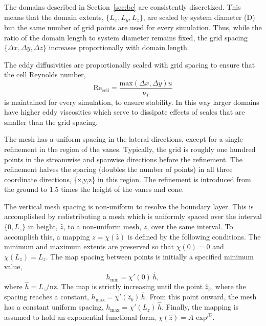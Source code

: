 %
%
The domains described in Section~\ref{sec:bc} are consistently
discretized. This means that the domain extents, $\{L_x,L_y,L_z\}$, are
scaled by system diameter (D) but the same number of grid points are
used for every simulation. Thus, while the ratio of the domain length to
system diameter remains fixed, the grid spacing $\{\Delta x,\Delta
y,\Delta z\}$ increases proportionally with domain length.  

The eddy diffusivities are proportionally scaled with grid spacing to
ensure that the cell Reynolds number, 
\begin{equation}
 \text{Re}_\text{cell} = \frac{\text{max}(\Delta x,\Delta y) u}{\nu_T}
\end{equation} 
is maintained for every simulation, to ensure stability. In this way
 larger domains have higher eddy viscosities which serve to dissipate
 effects of scales that are smaller than the grid spacing. 

The mesh has a uniform spacing in the lateral directions, except for a
single refinement in the region of the vanes. Typically, the grid is 
roughly one hundred points in the streamwise and spanwise directions
before the refinement. The refinement halves the spacing (doubles the
number of points) in all three coordinate directions, \{x,y,z\} in this
region. The refinement is introduced from the ground to 1.5 times the
height of the vanes and cone.

%
%
%
%
%

The vertical mesh spacing is non-uniform to resolve the boundary
layer.
This is accomplished by redistributing a mesh which is uniformly spaced over the 
interval $\{0,L_z\}$ in height, $\hat z$, to a non-uniform mesh, $z$, over the same interval. 
To accomplish this, a mapping $z = \chi(\hat z)$ is defined by the following conditions. 
The minimum and maximum extents are preserved so that $ \chi(0) = 0 $ and $ \chi(L_z) = L_z $. 
The map spacing between points is initially a specified minimum value, 
\begin{equation}
  h_{\text{min}} = \chi'(0) \, \hat h,
\end{equation}
where $\hat h = L_z/\text{nz}$. The map is strictly increasing until the 
point $\hat z_b$, where the spacing reaches a constant, 
$h_{\text{max}} = \chi'(\hat z_b) \, \hat h$. 
From this point onward, the mesh has a constant uniform spacing,  
$  h_{\text{max}} = \chi'(L_z) \, \hat h$. 
%
Finally, the mapping is assumed to hold an exponential functional form, 
$  \chi(\hat z) = A \text{ exp}^{\beta \hat z}$.

